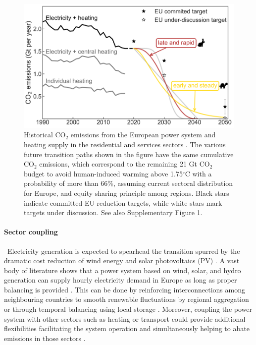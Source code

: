\documentclass[5p]{elsarticle} %
\begin{document}
\begin{figure}[!h]
\centering
	\includegraphics[width=\columnwidth]{../figures/carbon_budget_2.png}
\caption{Historical CO$_2$ emissions from the European power system and heating supply in the residential and services sectors \cite{UNFCCC_inventory}. The various future transition paths shown in the figure have the same cumulative CO$_2$ emissions, which correspond to the remaining 21 Gt CO$_2$ budget to avoid human-induced warming above 1.75$^{\circ}$C with a probability of more than 66\%, assuming current sectoral distribution for Europe, and equity sharing principle among regions. Black stars indicate committed EU reduction targets, while white stars mark targets under discussion. See also Supplementary Figure 1.} \label{fig_carbon_budget} 
\end{figure}

\FloatBarrier

\paragraph{\textbf{Sector coupling}} \
Electricity generation is expected to spearhead the transition spurred by the dramatic cost reduction of wind energy \cite{Lantz_2012} and solar photovoltaics (PV) \cite{Creutzig_2017, Haegel_2019}. A vast body of literature shows that a power system based on wind, solar, and hydro generation can supply hourly electricity demand in Europe as long as proper balancing is provided \cite{Eriksen_2017, Schlachtberger_2017, Gils_2017a, Brown_response}. This can be done by reinforcing interconnections among neighbouring countries \cite{Rodriguez_2014} to smooth renewable fluctuations by regional aggregation or through temporal balancing using local storage \cite{Rasmussen_2012, Cebulla_2017, Victoria_2019_storage}. Moreover, coupling the power system with other sectors such as heating or transport could provide additional flexibilities facilitating the system operation and simultaneously helping to abate emissions in those sectors \cite{Connolly_2016, Brown_2018, Child_2019}. \\
\end{document}
